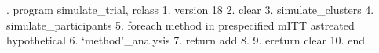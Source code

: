 . program simulate_trial, rclass
  1.   version 18
  2.   clear
  3.   simulate_clusters
  4.   simulate_participants
  5.   foreach method in prespecified mITT astreated hypothetical {\lbr}
  6.     `method'_analysis
  7.     return add
  8.   {\rbr}
  9.   ereturn clear
 10. end
{\smallskip}
